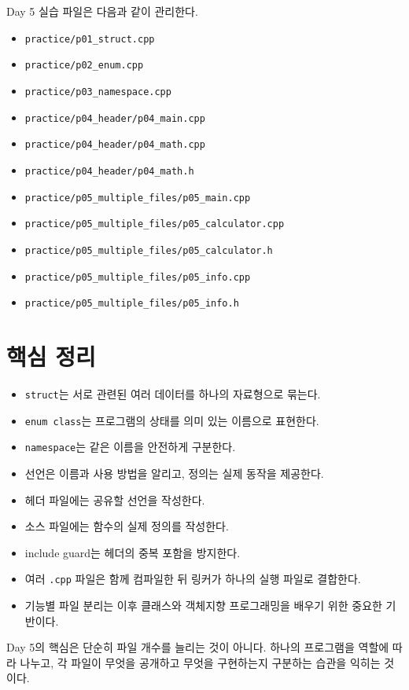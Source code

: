 \documentclass[11pt,a4paper]{article}
\begin{document}
\begin{practicebox}
Day 5 실습 파일은 다음과 같이 관리한다.
\begin{itemize}[leftmargin=1.5em]
    \item \texttt{practice/p01\_struct.cpp}
    \item \texttt{practice/p02\_enum.cpp}
    \item \texttt{practice/p03\_namespace.cpp}
    \item \texttt{practice/p04\_header/p04\_main.cpp}
    \item \texttt{practice/p04\_header/p04\_math.cpp}
    \item \texttt{practice/p04\_header/p04\_math.h}
    \item \texttt{practice/p05\_multiple\_files/p05\_main.cpp}
    \item \texttt{practice/p05\_multiple\_files/p05\_calculator.cpp}
    \item \texttt{practice/p05\_multiple\_files/p05\_calculator.h}
    \item \texttt{practice/p05\_multiple\_files/p05\_info.cpp}
    \item \texttt{practice/p05\_multiple\_files/p05\_info.h}
\end{itemize}
\end{practicebox}


\section{핵심 정리}

\begin{itemize}[leftmargin=1.5em]
    \item \texttt{struct}는 서로 관련된 여러 데이터를 하나의 자료형으로 묶는다.
    \item \texttt{enum class}는 프로그램의 상태를 의미 있는 이름으로 표현한다.
    \item \texttt{namespace}는 같은 이름을 안전하게 구분한다.
    \item 선언은 이름과 사용 방법을 알리고, 정의는 실제 동작을 제공한다.
    \item 헤더 파일에는 공유할 선언을 작성한다.
    \item 소스 파일에는 함수의 실제 정의를 작성한다.
    \item include guard는 헤더의 중복 포함을 방지한다.
    \item 여러 \texttt{.cpp} 파일은 함께 컴파일한 뒤 링커가 하나의 실행 파일로 결합한다.
    \item 기능별 파일 분리는 이후 클래스와 객체지향 프로그래밍을 배우기 위한 중요한 기반이다.
\end{itemize}

\begin{importantbox}
Day 5의 핵심은 단순히 파일 개수를 늘리는 것이 아니다.
하나의 프로그램을 역할에 따라 나누고, 각 파일이 무엇을 공개하고 무엇을 구현하는지 구분하는 습관을 익히는 것이다.
\end{importantbox}
\end{document}
